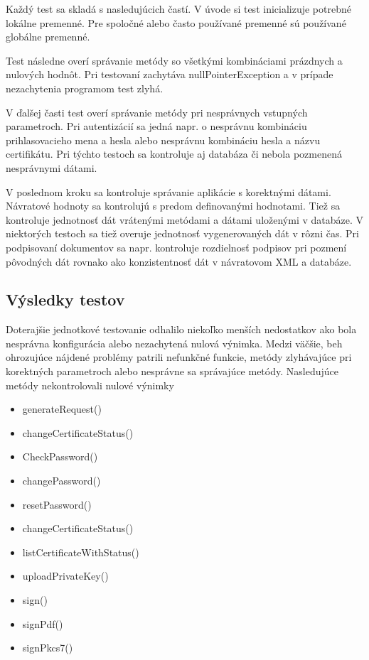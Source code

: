 \documentclass[
  digital, %
  table,   %
oneside,
  nolof,     %
  nolot,     %
]{fithesis3}
\begin{document}
Každý test sa skladá s nasledujúcich častí. V úvode si test inicializuje potrebné lokálne premenné. Pre spoločné alebo často používané premenné sú používané globálne premenné. 

Test následne overí správanie metódy so všetkými kombináciami prázdnych a nulových hodnôt. Pri testovaní zachytáva nullPointerException a v prípade nezachytenia programom test zlyhá.

 V ďalšej časti test overí správanie metódy pri nesprávnych vstupných parametroch. Pri autentizácií sa jedná napr. o nesprávnu kombináciu prihlasovacieho mena a hesla alebo nesprávnu kombináciu hesla a názvu certifikátu. Pri týchto testoch sa kontroluje aj databáza či nebola pozmenená nesprávnymi dátami.
 
  V poslednom kroku sa kontroluje správanie aplikácie s korektnými dátami. Návratové hodnoty sa kontrolujú s predom definovanými hodnotami. Tiež sa kontroluje jednotnosť dát vrátenými metódami a dátami uloženými v databáze. V niektorých testoch sa tiež overuje jednotnosť vygenerovaných dát v rôzni čas. Pri podpisovaní dokumentov sa napr. kontroluje rozdielnosť podpisov pri pozmení pôvodných dát rovnako ako konzistentnosť dát v návratovom XML a databáze.   

\subsection{Výsledky testov}
Doterajšie jednotkové testovanie odhalilo niekoľko menších nedostatkov ako bola nesprávna konfigurácia alebo nezachytená nulová výnimka. Medzi väčšie, beh ohrozujúce nájdené problémy patrili nefunkčné funkcie, metódy zlyhávajúce pri korektných parametroch alebo nesprávne sa správajúce metódy.  
Nasledujúce metódy nekontrolovali nulové výnimky 

\begin{itemize}

\item generateRequest()
\item changeCertificateStatus()
\item CheckPassword()
\item changePassword()
\item resetPassword()
\item changeCertificateStatus()
\item listCertificateWithStatus()
\item uploadPrivateKey()
\item sign()
\item signPdf()
\item signPkcs7()
 \end{itemize}
\end{document}
